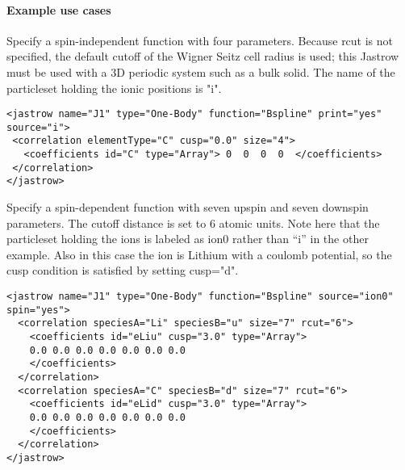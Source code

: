 \paragraph{Example use cases}
\label{sec:1bjsplineexamples}

Specify a spin-independent function with four parameters. Because rcut  is not 
specified, the default cutoff of the Wigner Seitz cell radius is used; this 
Jastrow must be used with a 3D periodic system such as a bulk solid. The name of 
the particleset holding the ionic positions is "i".
\begin{lstlisting}[style=QMCPXML]
<jastrow name="J1" type="One-Body" function="Bspline" print="yes" source="i">
 <correlation elementType="C" cusp="0.0" size="4">
   <coefficients id="C" type="Array"> 0  0  0  0  </coefficients>
 </correlation>
</jastrow>
\end{lstlisting}

Specify a spin-dependent function with seven upspin and seven downspin parameters. 
The cutoff distance is set to 6 atomic units.  Note here that the particleset holding
the ions is labeled as ion0 rather than ``i'' in the other example.  Also in this case
the ion is Lithium with a coulomb potential, so the cusp condition is satisfied by 
setting cusp="d".
\begin{lstlisting}[style=QMCPXML]
<jastrow name="J1" type="One-Body" function="Bspline" source="ion0" spin="yes">
  <correlation speciesA="Li" speciesB="u" size="7" rcut="6">
    <coefficients id="eLiu" cusp="3.0" type="Array"> 
    0.0 0.0 0.0 0.0 0.0 0.0 0.0
    </coefficients>
  </correlation>
  <correlation speciesA="C" speciesB="d" size="7" rcut="6">
    <coefficients id="eLid" cusp="3.0" type="Array"> 
    0.0 0.0 0.0 0.0 0.0 0.0 0.0
    </coefficients>
  </correlation>
</jastrow>
\end{lstlisting}

